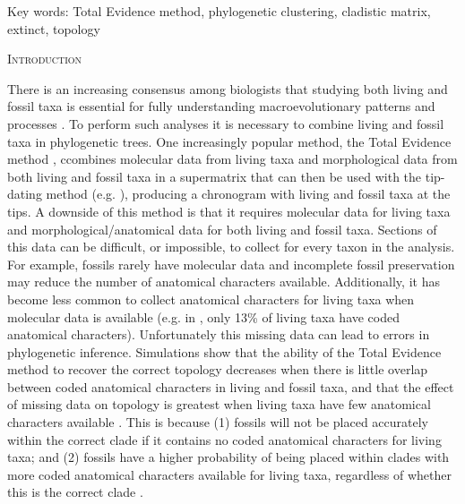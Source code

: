 \documentclass[12pt,letterpaper]{article}
\renewcommand{\section}[1]{%
\bigskip
\begin{center}
\begin{Large}
\normalfont\scshape #1
\medskip
\end{Large}
\end{center}}
\begin{document}
\noindent Key words: Total Evidence method, phylogenetic clustering, cladistic matrix, extinct, topology\\

\vspace{1.5in}

%
%
\newpage 
\section{Introduction}
There is an increasing consensus among biologists that studying both living and fossil taxa is essential for fully understanding macroevolutionary patterns and processes \cite{slaterunifying2013,fritzdiversity2013}.
To perform such analyses it is necessary to combine living and fossil taxa in phylogenetic trees.
One increasingly popular method, the Total Evidence method \cite{ronquista2012}, ccombines molecular data from living taxa and morphological data from both living and fossil taxa in a supermatrix that can then be used with the tip-dating method (e.g. \cite{pyrondivergence2011,ronquista2012,schragocombining2013,slaterunifying2013,beckancient2014}), producing a chronogram with living and fossil taxa at the tips.
A downside of this method is that it requires molecular data for living taxa and morphological/anatomical data for both living and fossil taxa.
Sections of this data can be difficult, or impossible, to collect for every taxon in the analysis.
For example, fossils rarely have molecular data and incomplete fossil preservation may reduce the number of anatomical characters available.
Additionally, it has become less common to collect anatomical characters for living taxa when molecular data is available (e.g. in \cite{slaterphylogenetic2013}, only 13\% of living taxa have coded anatomical characters).
Unfortunately this missing data can lead to errors in phylogenetic inference.
Simulations show that the ability of the Total Evidence method to recover the correct topology decreases when there is little overlap between coded anatomical characters in living and fossil taxa, and that the effect of missing data on topology is greatest when living taxa have few anatomical characters available \cite{GuillermeCooper}.
This is because (1) fossils will not be placed accurately within the correct clade if it contains no coded anatomical characters for living taxa; and (2) fossils have a higher probability of being placed within clades with more coded anatomical characters available for living taxa, regardless of whether this is the correct clade \cite{GuillermeCooper}. 
\end{document}
